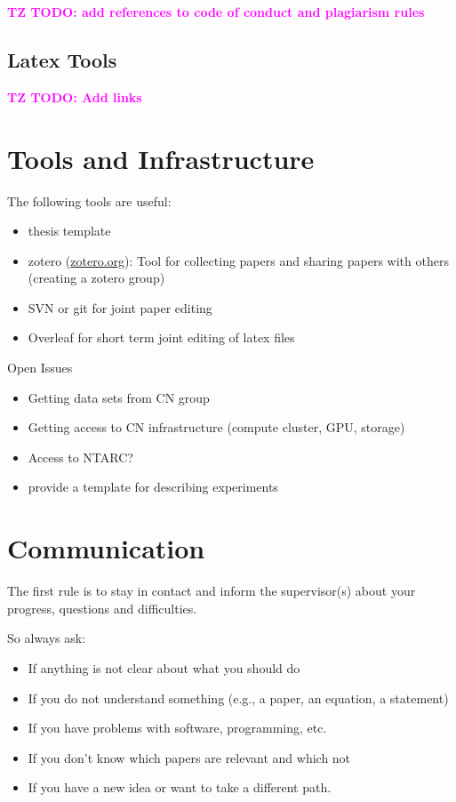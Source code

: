 \textcolor{magenta}{\textbf{TZ TODO: add references to code of conduct and plagiarism rules}}


\subsection{Latex Tools}

\textcolor{magenta}{ \textbf{TZ TODO: Add links}}

\section{Tools and Infrastructure}

The following tools are useful:
\begin{itemize}
	\item thesis template
	\item zotero (\url{zotero.org}): Tool  for collecting papers and sharing papers with others (creating a zotero group)
	\item SVN or git for joint paper editing
	\item Overleaf for short term joint editing of latex files
\end{itemize} 

Open Issues
\begin{itemize}
	\item Getting data sets from CN group
	\item Getting access to CN infrastructure (compute cluster, GPU, storage)
	\item Access to NTARC?
	\item provide a template for describing experiments
\end{itemize}

\section{Communication}

The first rule is to stay in contact and inform the supervisor(s) about your progress, questions and difficulties.

So always ask:

\begin{itemize}
	\item If anything is not clear about what you should do
	\item If you do not understand something (e.g., a paper, an equation, a statement)
	\item If you have problems with software, programming, etc.
	\item If you don’t know which papers are relevant and which not
	\item If you have a new idea or want to take a different path.
\end{itemize}

